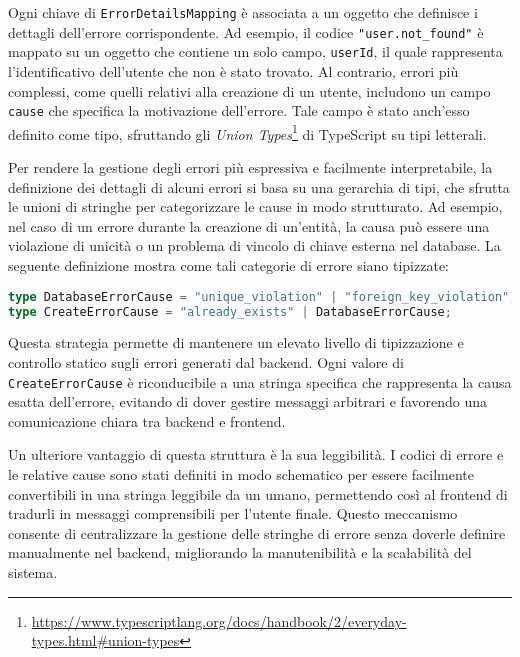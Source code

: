 Ogni chiave di \texttt{ErrorDetailsMapping} è associata a un oggetto che definisce i dettagli dell’errore corrispondente. Ad esempio, il codice \texttt{"user.not\_found"} è mappato su un oggetto che contiene un solo campo, \texttt{userId}, il quale rappresenta l'identificativo dell'utente che non è stato trovato. Al contrario, errori più complessi, come quelli relativi alla creazione di un utente, includono un campo \texttt{cause} che specifica la motivazione dell'errore. Tale campo è stato anch'esso definito come tipo, sfruttando gli \textit{Union Types}\footnote{\url{https://www.typescriptlang.org/docs/handbook/2/everyday-types.html\#union-types}} di TypeScript su tipi letterali.

Per rendere la gestione degli errori più espressiva e facilmente interpretabile, la definizione dei dettagli di alcuni errori si basa su una gerarchia di tipi, che sfrutta le unioni di stringhe per categorizzare le cause in modo strutturato. Ad esempio, nel caso di un errore durante la creazione di un'entità, la causa può essere una violazione di unicità o un problema di vincolo di chiave esterna nel database. La seguente definizione mostra come tali categorie di errore siano tipizzate:

\begin{lstlisting}[language=typescript, caption={Definizione del tipo \texttt{cause} per operazioni di creazione}, label={lst:createErrorCause}]
type DatabaseErrorCause = "unique_violation" | "foreign_key_violation";
type CreateErrorCause = "already_exists" | DatabaseErrorCause;
\end{lstlisting}

Questa strategia permette di mantenere un elevato livello di tipizzazione e controllo statico sugli errori generati dal backend. Ogni valore di \texttt{CreateErrorCause} è riconducibile a una stringa specifica che rappresenta la causa esatta dell'errore, evitando di dover gestire messaggi arbitrari e favorendo una comunicazione chiara tra backend e frontend.

Un ulteriore vantaggio di questa struttura è la sua leggibilità. I codici di errore e le relative cause sono stati definiti in modo schematico per essere facilmente convertibili in una stringa leggibile da un umano, permettendo così al frontend di tradurli in messaggi comprensibili per l'utente finale. Questo meccanismo consente di centralizzare la gestione delle stringhe di errore senza doverle definire manualmente nel backend, migliorando la manutenibilità e la scalabilità del sistema.

